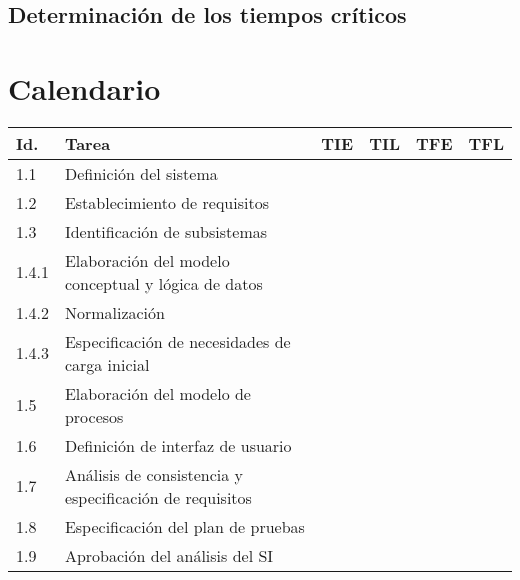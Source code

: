 \documentclass[11pt,a4paper,spanish,twoside]{report}
\begin{document}
\section{Determinación de los tiempos críticos}

\chapter{Calendario}

\begin{table}[!h]
\centering
   \begin{tabular}{|p{0.8cm}||p{5cm}||p{1.5cm}|p{1.5cm}|p{1.5cm}|p{1.5cm}|}
     \hline
     \textbf{Id.} & \textbf{Tarea} & \textbf{TIE} & \textbf{TIL} &
     \textbf{TFE} & \textbf{TFL}\\
     \hline
      1.1 & Definición del sistema  &  &  &  &  \\
      \hline
      1.2 & Establecimiento de requisitos  &  &  &  &  \\
      \hline
      1.3 & Identificación de subsistemas  &  &  &  &  \\
      \hline
      1.4.1 & Elaboración del modelo conceptual y lógica de datos &  &  &  &  \\
      \hline
      1.4.2 & Normalización  &  &  &  &  \\
      \hline
      1.4.3 & Especificación de necesidades de carga inicial  &  &  &  &  \\
      \hline
      1.5 & Elaboración del modelo de procesos  &  &  &  &  \\
      \hline
      1.6 & Definición de interfaz de usuario  &  &  &  &  \\
      \hline
      1.7 & Análisis de consistencia y especificación de requisitos & & & &\\
      \hline
      1.8 & Especificación del plan de pruebas &  &  &  &\\
      \hline
      1.9 & Aprobación del análisis del SI &  &  &  &  \\
      \hline \hline


\end{tabular}
\end{table}
\end{document}
